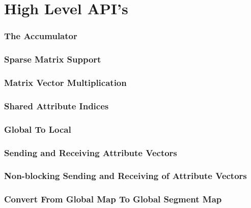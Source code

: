 \documentclass{article}
\begin{document}
\part{High Level API's}
\section{The Accumulator}



\section{Sparse Matrix Support}




%
\section{Matrix Vector Multiplication}

%
\section{Shared Attribute Indices}

%
\section{Global To Local}

%
\section{Sending and Receiving Attribute Vectors}


%
\section{Non-blocking Sending and Receiving of Attribute Vectors}

%
\section{Convert From Global Map To Global Segment Map}



 
%
\end{document}
